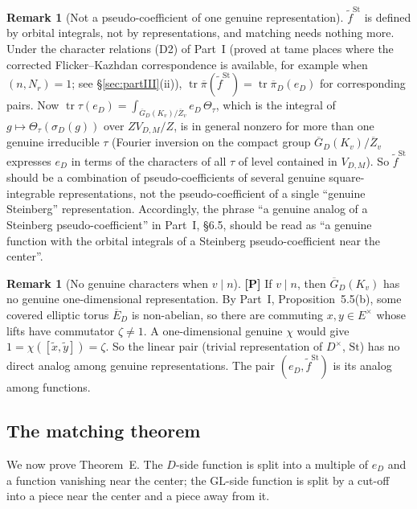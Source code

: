 \documentclass[12pt]{article}
\newcommand{\ov}[1]{\overline{#1}}
\newcommand{\tr}{\operatorname{tr}}
\newcommand{\GL}{\mathrm{GL}}
\newcommand{\St}{\mathrm{St}}
\newcommand{\Zb}{\ov{Z}}
\newcommand{\GDb}{\ov{G}_D}
\newcommand{\pib}{\ov{\pi}}
\newcommand{\Eb}{\ov{E}}
\newcommand{\sg}{\sigma}
\newcommand{\Pv}{\textbf{[P]}}
\theoremstyle{plain}
\theoremstyle{definition}
\newtheorem{remark}[theorem]{Remark}
\begin{document}
\begin{remark}[Not a pseudo-coefficient of one genuine representation]\label{rem:notpc}
$\tilde f^{\St}$ is defined by orbital integrals, not by representations, and matching needs nothing more. Under the character relations (D2) of Part~I (proved at tame places where the corrected Flicker--Kazhdan correspondence is available, for example when $(n,N_r)=1$; see \S\ref{sec:partIII}(ii)), $\tr\pib(\tilde f^{\St})=\tr\pib_D(e_D)$ for corresponding pairs. Now $\tr\tau(e_D)=\int_{\GDb(K_v)/\Zb_v}e_D\,\Theta_\tau$, which is the integral of $g\mapsto\Theta_\tau(\sg_D(g))$ over $ZV_{D,M}/Z$, is in general nonzero for more than one genuine irreducible $\tau$ (Fourier inversion on the compact group $\GDb(K_v)/\Zb_v$ expresses $e_D$ in terms of the characters of all $\tau$ of level contained in $V_{D,M}$). So $\tilde f^{\St}$ should be a combination of pseudo-coefficients of several genuine square-integrable representations, not the pseudo-coefficient of a single ``genuine Steinberg'' representation. Accordingly, the phrase ``a genuine analog of a Steinberg pseudo-coefficient'' in Part~I, \S6.5, should be read as ``a genuine function with the orbital integrals of a Steinberg pseudo-coefficient near the center''.
\end{remark}

\begin{remark}[No genuine characters when $v\mid n$]\label{rem:nochar}\Pv
If $v\mid n$, then $\GDb(K_v)$ has no genuine one-dimensional representation. By Part~I, Proposition~5.5(b), some covered elliptic torus $\Eb_D$ is non-abelian, so there are commuting $x,y\in E^\times$ whose lifts have commutator $\zeta\ne1$. A one-dimensional genuine $\chi$ would give $1=\chi([\tilde x,\tilde y])=\zeta$. So the linear pair (trivial representation of $D^\times$, $\St$) has no direct analog among genuine representations. The pair $(e_D,\tilde f^{\St})$ is its analog among functions.
\end{remark}


\subsection{The matching theorem}\label{subsec:matchthm}
We now prove Theorem~E. The $D$-side function is split into a multiple of $e_D$ and a function vanishing near the center; the $\GL$-side function is split by a cut-off into a piece near the center and a piece away from it.
\end{document}
